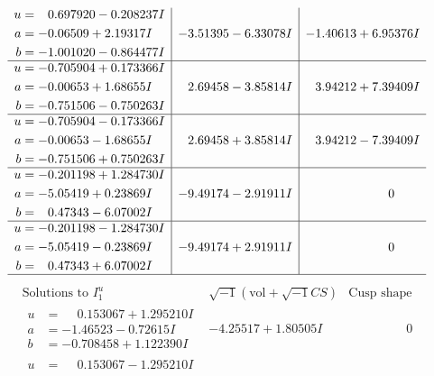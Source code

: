 \documentclass[1p]{elsarticle_modified}
\theoremstyle{definition}
\newcommand{\I}{\sqrt{-1}}
\begin{document}
$$\begin{array}{c|c|c}
\begin{aligned}
u &= \phantom{-}0.697920 - 0.208237 I \\
a &= -0.06509 + 2.19317 I \\
b &= -1.001020 - 0.864477 I\end{aligned}
 & -3.51395 - 6.33078 I & -1.40613 + 6.95376 I \\ \hline\begin{aligned}
u &= -0.705904 + 0.173366 I \\
a &= -0.00653 + 1.68655 I \\
b &= -0.751506 - 0.750263 I\end{aligned}
 & \phantom{-}2.69458 - 3.85814 I & \phantom{-}3.94212 + 7.39409 I \\ \hline\begin{aligned}
u &= -0.705904 - 0.173366 I \\
a &= -0.00653 - 1.68655 I \\
b &= -0.751506 + 0.750263 I\end{aligned}
 & \phantom{-}2.69458 + 3.85814 I & \phantom{-}3.94212 - 7.39409 I \\ \hline\begin{aligned}
u &= -0.201198 + 1.284730 I \\
a &= -5.05419 + 0.23869 I \\
b &= \phantom{-}0.47343 - 6.07002 I\end{aligned}
 & -9.49174 - 2.91911 I & \phantom{-0.000000 } 0 \\ \hline\begin{aligned}
u &= -0.201198 - 1.284730 I \\
a &= -5.05419 - 0.23869 I \\
b &= \phantom{-}0.47343 + 6.07002 I\end{aligned}
 & -9.49174 + 2.91911 I & \phantom{-0.000000 } 0\\
 \hline 
 \end{array}$$\newpage$$\begin{array}{c|c|c}  
\text{Solutions to }I^u_{1}& \I (\text{vol} + \sqrt{-1}CS) & \text{Cusp shape}\\
 \hline 
\begin{aligned}
u &= \phantom{-}0.153067 + 1.295210 I \\
a &= -1.46523 - 0.72615 I \\
b &= -0.708458 + 1.122390 I\end{aligned}
 & -4.25517 + 1.80505 I & \phantom{-0.000000 } 0 \\ \hline\begin{aligned}
u &= \phantom{-}0.153067 - 1.295210 I \\

\end{aligned}
\end{array}$$
\end{document}
